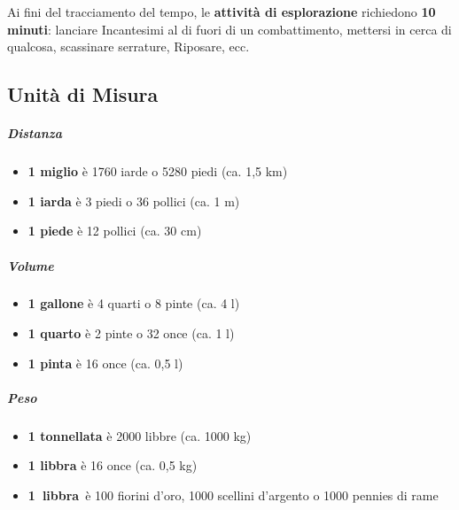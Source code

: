 \documentclass[itdr]{subfiles}
\begin{document}
Ai fini del tracciamento del tempo, le \textbf{attività di esplorazione} richiedono \textbf{10 minuti}: lanciare Incantesimi al di fuori di un combattimento, mettersi in cerca di qualcosa, scassinare serrature, Riposare, ecc.

\vfill

\begin{dbox}
	\subsection*{Unità di Misura}
	
	\subparagraph{Distanza}
	\begin{itemize}
		\item \textbf{1 miglio} è 1760 iarde o 5280 piedi (ca. 1,5 km)
		\item \textbf{1 iarda} è 3 piedi o 36 pollici (ca. 1 m)
		\item \textbf{1 piede} è 12 pollici (ca. 30 cm)
	\end{itemize}

	\subparagraph{Volume}
	\begin{itemize}
		\item \textbf{1 gallone} è 4 quarti o 8 pinte (ca. 4 l)
		\item \textbf{1 quarto} è 2 pinte o 32 once (ca. 1 l)
		\item \textbf{1 pinta} è 16 once (ca. 0,5 l)
	\end{itemize}
	
	\subparagraph{Peso}
	\begin{itemize}
		\item \textbf{1 tonnellata} è 2000 libbre (ca. 1000 kg)
		\item \textbf{1 libbra} è 16 once (ca. 0,5 kg)
		\item \mbox{\textbf{1 libbra} è} 100 fiorini d'oro, 1000 scellini d'argento o 1000 pennies di rame
	\end{itemize}
\end{dbox}

\break
\end{document}
